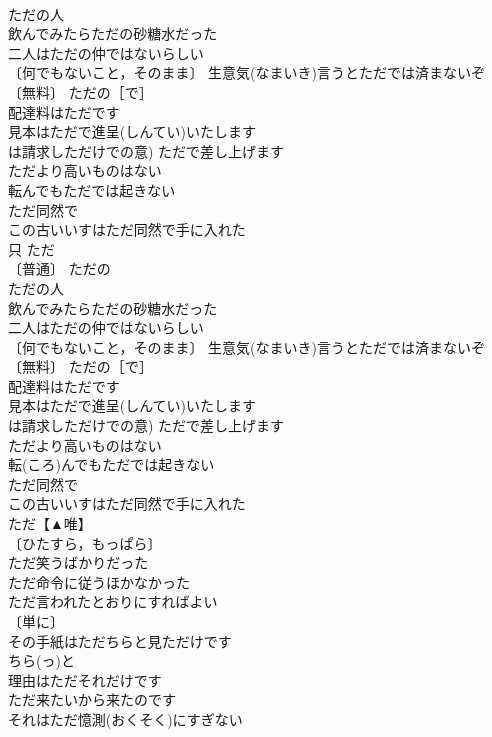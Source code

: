 \documentclass[8pt]{extreport}
\begin{document}
\begin{CJK}{UTF8}{min}
\\	ただの人 
\\	飲んでみたらただの砂糖水だった 
\\	二人はただの仲ではないらしい 
\\	〔何でもないこと，そのまま〕 生意気(なまいき)言うとただでは済まないぞ 
\\	〔無料〕 ただの［で］ 
\\	配達料はただです 
\\	見本はただで進呈(しんてい)いたします 
\\	は請求しただけでの意) ただで差し上げます 
\\	ただより高いものはない 
\\	転んでもただでは起きない 
\\	ただ同然で 
\\	この古いいすはただ同然で手に入れた 
\\	只	ただ	
\\	〔普通〕 ただの 
\\	ただの人 
\\	飲んでみたらただの砂糖水だった 
\\	二人はただの仲ではないらしい 
\\	〔何でもないこと，そのまま〕 生意気(なまいき)言うとただでは済まないぞ 
\\	〔無料〕 ただの［で］ 
\\	配達料はただです 
\\	見本はただで進呈(しんてい)いたします 
\\	は請求しただけでの意) ただで差し上げます 
\\	ただより高いものはない 
\\	転(ころ)んでもただでは起きない 
\\	ただ同然で 
\\	この古いいすはただ同然で手に入れた 
\\	ただ【▲唯】 
\\	〔ひたすら，もっぱら〕
\\	ただ笑うばかりだった 
\\	ただ命令に従うほかなかった 
\\	ただ言われたとおりにすればよい 
\\	〔単に〕
\\	その手紙はただちらと見ただけです 
\\	ちら(っ)と 
\\	理由はただそれだけです 
\\	ただ来たいから来たのです 
\\	それはただ憶測(おくそく)にすぎない 

\end{CJK}
\end{document}
